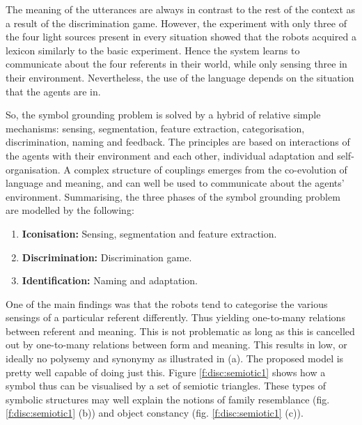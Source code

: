 The meaning of the utterances are always in contrast to the rest of the context as a result of the discrimination game. However, the experiment with only three of the four light sources present in every situation showed that the robots acquired a lexicon similarly to the basic experiment. Hence the system learns to communicate about the four referents in their world, while only sensing three in their environment. Nevertheless, the use of the language depends on the situation that the agents are in.

So, the symbol grounding problem is solved by a hybrid of relative simple mechanisms: sensing, segmentation, feature extraction, categorisation, discrimination, naming and feedback. The principles are based on interactions of the agents with their environment and each other, individual adaptation and self-organisation. A complex structure of couplings emerges from the co-evolution of language and meaning, and can well be used to communicate about the agents' environment. Summarising, the three phases of the symbol grounding problem are modelled by the following:

\begin{enumerate}
\item {\bf Iconisation:} Sensing, segmentation and feature extraction.
\item {\bf Discrimination:} Discrimination game.
\item {\bf Identification:} Naming and adaptation.
\end{enumerate}

One of the main findings was that the robots tend to categorise the various sensings of a particular referent differently. Thus yielding one-to-many relations between referent and meaning. This is not problematic as long as this is cancelled out by one-to-many relations between form and meaning. This results in low, or ideally no polysemy and synonymy as illustrated in  (a). The proposed model is pretty well capable of doing just this. Figure \ref{f:disc:semiotic1} shows how a symbol thus can be visualised by a set of semiotic triangles. These types of symbolic structures may well explain the notions of family resemblance (fig. \ref{f:disc:semiotic1} (b)) and object constancy (fig. \ref{f:disc:semiotic1} (c)).

